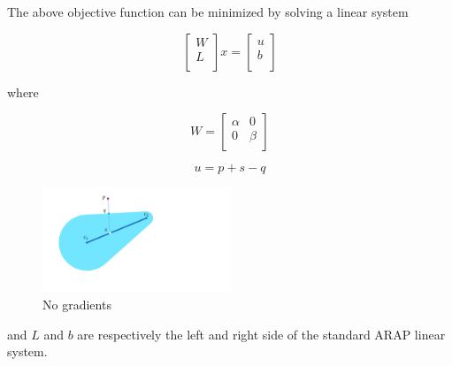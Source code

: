 \documentclass[tog]{acmsiggraph}
\begin{document}
The above objective function can be minimized by solving a linear system 

\begin{equation}
\left[\begin{array}{c}
W \\    
L \\ 
 \end{array}\right]
 x = 
 \left[\begin{array}{c}
u \\    
b \\ 
 \end{array}\right]
\end{equation}

where 

\begin{equation}
W = \left[
\begin{array}{cc}
\alpha & 0 \\    
0 & \beta \\ 
 \end{array} 
 \right]
\end{equation}


\begin{equation}
u = p + s - q
\end{equation}

\begin{figure}[h] 
	\centering
	\hspace{0em}
	\includegraphics[trim = 20mm 20mm 130mm 50mm, width=0.5\textwidth]{fig/no_gradients}
	\caption{No gradients}
	\label{fig:no_gradients}
\end{figure}

and $L$ and $b$ are respectively the left and right side of the standard ARAP linear system.



 

\end{document}
